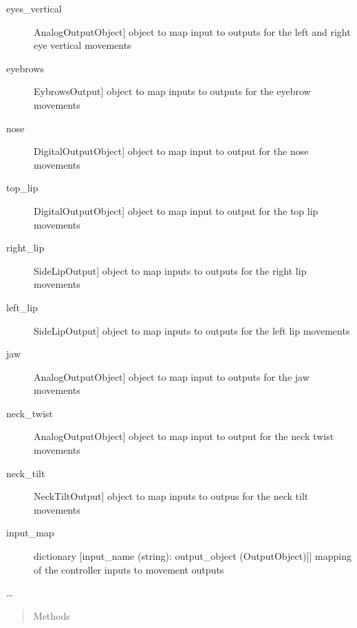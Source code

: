 \documentclass[letterpaper,10pt,english]{sphinxmanual}
\begin{document}
\begin{fulllineitems}
\begin{description}
\item[{eyes\_vertical}] \leavevmode{[}AnalogOutputObject{]}
\sphinxAtStartPar
object to map input to outputs for the left and right eye vertical movements

\item[{eyebrows}] \leavevmode{[}EybrowsOutput{]}
\sphinxAtStartPar
object to map inputs to outputs for the eyebrow movements

\item[{nose}] \leavevmode{[}DigitalOutputObject{]}
\sphinxAtStartPar
object to map input to output for the nose movements

\item[{top\_lip}] \leavevmode{[}DigitalOutputObject{]}
\sphinxAtStartPar
object to map input to output for the top lip movements

\item[{right\_lip}] \leavevmode{[}SideLipOutput{]}
\sphinxAtStartPar
object to map inputs to outputs for the right lip movements

\item[{left\_lip}] \leavevmode{[}SideLipOutput{]}
\sphinxAtStartPar
object to map inputs to outputs for the left lip movements

\item[{jaw}] \leavevmode{[}AnalogOutputObject{]}
\sphinxAtStartPar
object to map input to outputs for the jaw movements

\item[{neck\_twist}] \leavevmode{[}AnalogOutputObject{]}
\sphinxAtStartPar
object to map input to output for the neck twist movements

\item[{neck\_tilt}] \leavevmode{[}NeckTiltOutput{]}
\sphinxAtStartPar
object to map inputs to outpus for the neck tilt movements

\item[{input\_map}] \leavevmode{[}dictionary {[}input\_name (string): output\_object (OutputObject){]}{]}
\sphinxAtStartPar
mapping of the controller inputs to movement outputs

\end{description}

\sphinxAtStartPar
…
\begin{quote}\begin{description}
\item[{Methods}] \leavevmode
\end{description}\end{quote}


\end{fulllineitems}
\end{document}
